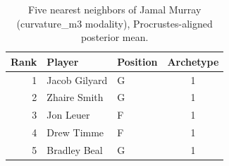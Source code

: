 \begin{table}[htbp]
  \centering\small
  \begin{tabular}{rllc}
    \toprule
    Rank & Player & Position & Archetype \\
    \midrule
    1 & Jacob Gilyard & G & 1 \\
    2 & Zhaire Smith & G & 1 \\
    3 & Jon Leuer & F & 1 \\
    4 & Drew Timme & F & 1 \\
    5 & Bradley Beal & G & 1 \\
    \bottomrule
  \end{tabular}
  \caption{Five nearest neighbors of Jamal Murray (curvature_m3 modality), Procrustes-aligned posterior mean.}
  \label{tab:Jamal_Murray_neighbors_curvature_m3}
\end{table}

